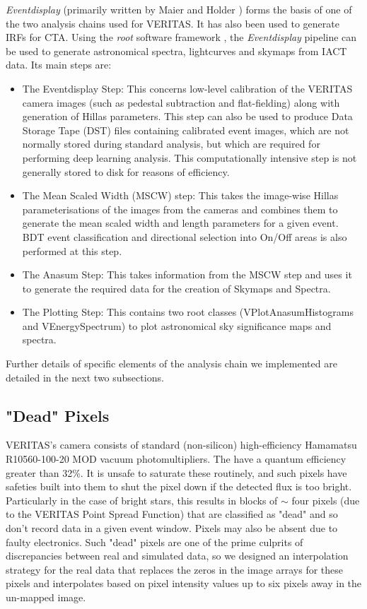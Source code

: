 \textit{Eventdisplay} (primarily written by Maier and Holder \cite{evdisp}) forms the basis of one of the two analysis chains used for VERITAS. It has also been used to generate IRFs for CTA. Using the \textit{root} software framework \cite{root}, the \textit{Eventdisplay} pipeline can be used to generate astronomical spectra, lightcurves and skymaps from IACT data. Its main steps are:

\begin{itemize}
\item The Eventdisplay Step: This concerns low-level calibration of the VERITAS camera images (such as pedestal subtraction and flat-fielding) along with generation of Hillas parameters. This step can also be used to produce Data Storage Tape (DST) files containing calibrated event images, which are not normally stored during standard analysis, but which are required for performing deep learning analysis. This computationally intensive step is not generally stored to disk for reasons of efficiency.

\item The Mean Scaled Width (MSCW) step: This takes the image-wise Hillas parameterisations of the images from the cameras and combines them to generate the mean scaled width and length parameters for a given event. BDT event classification and directional selection into On/Off areas is also performed at this step. 

\item The Anasum Step: This takes information from the MSCW step and uses it to generate the required data for the creation of Skymaps and Spectra. 

\item The Plotting Step: This contains two root classes (VPlotAnasumHistograms and VEnergySpectrum) to plot astronomical sky significance maps and spectra.

\end{itemize}

Further details of specific elements of the analysis chain we implemented are detailed in the next two subsections.
\subsection{"Dead" Pixels}
VERITAS's camera consists of standard (non-silicon) high-efficiency \cite{vercam} Hamamatsu R10560-100-20 MOD vacuum photomultipliers.  The have a quantum efficiency greater than 32\%. It is unsafe to saturate these routinely, and such pixels have safeties built into them to shut the pixel down if the detected flux is too bright. Particularly in the case of bright stars, this results in blocks of $\sim$ four pixels (due to the VERITAS Point Spread Function) that are classified as "dead" and so don't record data in a given event window. Pixels may also be absent due to faulty electronics. Such "dead" pixels are one of the prime culprits of discrepancies between real and simulated data, so we designed an interpolation strategy for the real data that replaces the zeros in the image arrays for these pixels and interpolates based on pixel intensity values up to six pixels away in the un-mapped image.  


